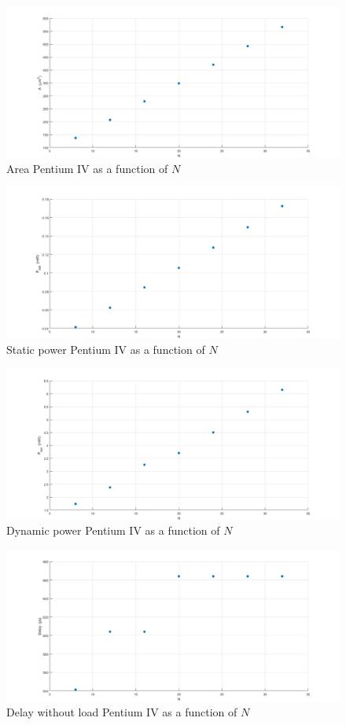 \begin{figure}[H]
\centering
\includegraphics[width = 14 cm]{pentium/result_area.png}
\caption{Area Pentium IV as a function of $N$}
\label{result_area}
\end{figure}

\begin{figure}[H]
\centering
\includegraphics[width = 14 cm]{pentium/result_Pstat.png}
\caption{Static power Pentium IV as a function of $N$}
\label{result_Pstat}
\end{figure}

\begin{figure}[H]
\centering
\includegraphics[width = 14 cm]{pentium/result_Pdyn.png}
\caption{Dynamic power Pentium IV as a function of $N$}
\label{result_Pdyn}
\end{figure}

\begin{figure}[H]
\centering
\includegraphics[width = 14 cm]{pentium/result_delay.png}
\caption{Delay without load Pentium IV as a function of $N$}
\label{result_delay}
\end{figure}


